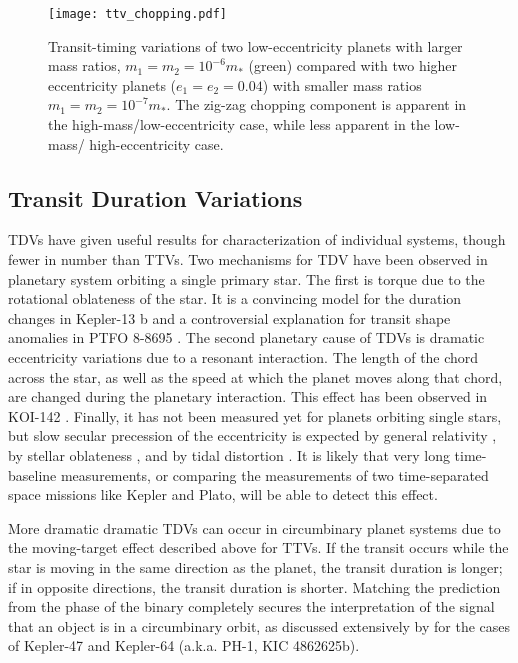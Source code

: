 \documentclass[graybox,natbib,nosecnum]{svmult}
\begin{document}
\begin{figure}
\centerline{
\texttt{[image: ttv\_chopping.pdf]}}
%
\caption{Transit-timing variations of two low-eccentricity planets with larger
mass ratios, $m_1 = m_2 = 10^{-6} m_*$ (green) compared with two higher eccentricity planets ($e_1=e_2=0.04$)
with smaller mass ratios $m_1 = m_2 = 10^{-7} m_*$.  The zig-zag chopping component
is apparent in the high-mass/low-eccentricity case, while less apparent in the low-mass/
high-eccentricity case.}
\label{ttv_chopping}       %
\end{figure}



\subsection{Transit Duration Variations}

TDVs have given useful results for characterization of individual systems, though fewer in number than TTVs.  Two mechanisms for TDV have been observed in planetary system orbiting a single primary star.  The first is torque due to the rotational oblateness of the star.  It is a convincing model for the duration changes in Kepler-13 b \citep[KOI 13.01][]{Szab2012} and a controversial explanation for transit shape anomalies in PTFO 8-8695 \citep{2013ApJ...774...53B}.  The second planetary cause of TDVs is dramatic eccentricity variations due to a resonant interaction.  The length of the chord across the star, as well as the speed at which the planet moves along that chord, are changed during the planetary interaction.  This effect has been observed in KOI-142 \citep{2013ApJ...777....3N}.  Finally, it has not been measured yet for planets orbiting single stars, but slow secular precession of the eccentricity is expected by general relativity \citep{2008MNRAS.389..191P}, by stellar oblateness \citep{2007MNRAS.377.1511H}, and by tidal distortion \citep{2009ApJ...698.1778R}.  It is likely that very long time-baseline measurements, or comparing the measurements of two time-separated space missions like Kepler and Plato, will be able to detect this effect.

More dramatic dramatic TDVs can occur in circumbinary planet systems due to the moving-target effect described above for TTVs.  If the transit occurs while the star is moving in the same direction as the planet, the transit duration is longer; if in opposite directions, the transit duration is shorter.  Matching the prediction from the phase of the binary completely secures the interpretation of the signal that an object is in a circumbinary orbit, as discussed extensively by \cite{2013ApJ...770...52K} for the cases of Kepler-47 and Kepler-64 (a.k.a. PH-1, KIC 4862625b).
\end{document}

